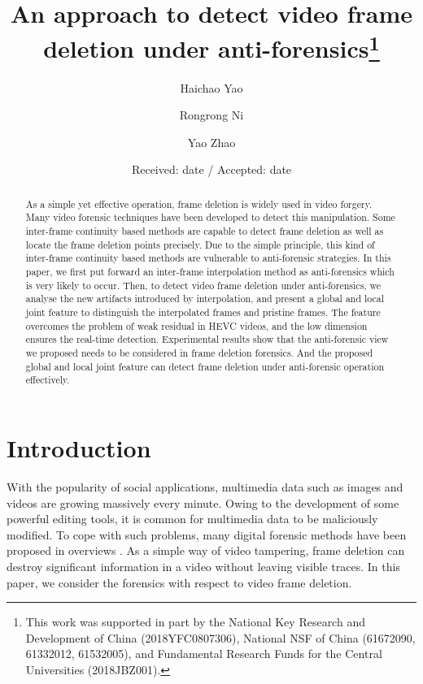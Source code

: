 \documentclass[pdftex,twocolumn,epjc3]{svjour3}          %
\begin{document}
\title{An approach to detect video frame deletion under anti-forensics\thanks{This work was supported in part by the National Key Research and Development of China (2018YFC0807306), National NSF of China (61672090, 61332012, 61532005), and Fundamental Research Funds for the Central Universities (2018JBZ001).}}


\author{Haichao Yao
\and
Rongrong Ni
\and
Yao Zhao}

\date{Received: date / Accepted: date}

\maketitle

\begin{abstract}
As a simple yet effective operation, frame deletion is widely
used in video forgery. Many video forensic techniques have been
developed to detect this manipulation. Some inter-frame
continuity based methods are capable to detect frame deletion as well as
locate the frame deletion points precisely. Due to the simple principle,
this kind of inter-frame continuity based methods are vulnerable to anti-forensic
strategies. In this paper, we first put forward an inter-frame interpolation method as anti-forensics which is very likely to occur. Then, to detect video frame deletion under anti-forensics, we analyse
the new artifacts introduced by interpolation, and present a global and local joint feature to distinguish the interpolated frames
and pristine frames. The feature overcomes the problem of weak residual in HEVC videos, and the low dimension ensures the real-time detection.
Experimental results show that the anti-forensic view we proposed needs to be considered in frame deletion forensics. And the proposed global and local joint feature can detect frame deletion under anti-forensic operation effectively.
\end{abstract}

\section{Introduction}
\label{intro}
With the popularity of social applications, multimedia data such as images and videos are growing massively every minute. Owing to the development of some powerful editing tools, it is common for multimedia data to be maliciously modified. To cope with such problems, many digital forensic methods have been proposed in overviews \cite{A1,A2,A3}. As a simple way of video tampering, frame deletion can destroy significant information in a video without leaving visible traces. In this paper, we consider the forensics with respect to video frame deletion.
\end{document}
